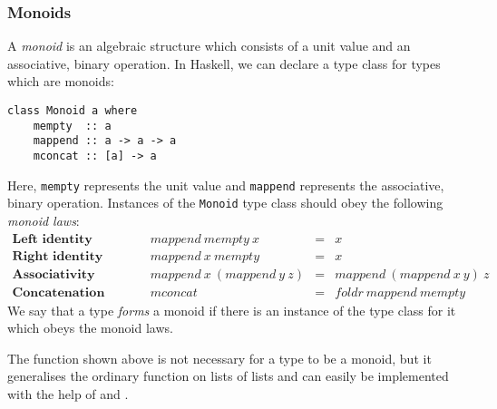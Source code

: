 \taskLine



\taskLine 

\subsubsection{Monoids}

A \emph{monoid} is an algebraic structure which consists of a unit value and an associative, binary operation. In Haskell, we can declare a type class for types which are monoids:
\begin{verbatim}
class Monoid a where
    mempty  :: a
    mappend :: a -> a -> a
    mconcat :: [a] -> a
\end{verbatim}
Here, \texttt{mempty} represents the unit value and \texttt{mappend} represents the associative, binary operation. Instances of the \texttt{Monoid} type class should obey the following \emph{monoid laws}:
\begin{displaymath}
\begin{array}{lcrcl}
\textbf{Left identity} &\qquad & \mathit{mappend}~\mathit{mempty}~x & = & x \\
\textbf{Right identity} &\qquad & \mathit{mappend}~x~\mathit{mempty} & = & x \\
\textbf{Associativity} & \qquad & \mathit{mappend}~x~(\mathit{mappend}~y~z) & = & \mathit{mappend}~(\mathit{mappend}~x~y)~z \\
\textbf{Concatenation} & \qquad & \mathit{mconcat} & = & \mathit{foldr}~\mathit{mappend}~\mathit{mempty}
\end{array}
\end{displaymath}
We say that a type \emph{forms} a monoid if there is an instance of the  type class for it which obeys the monoid laws. 

The  function shown above is not necessary for a type to be a monoid, but it generalises the ordinary  function on lists of lists and can easily be implemented with the help of  and .

